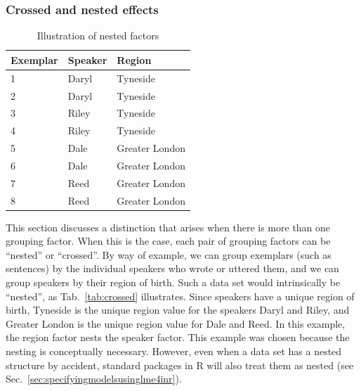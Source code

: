 \subsubsection{Crossed and nested effects}
\label{sec:crossedandnestedeffects}

\begin{table}
  \centering
  \caption{Illustration of nested factors}
  \begin{tabular}{lll}
    \toprule
    \textbf{Exemplar} & \textbf{Speaker}  & \textbf{Region}        \\
    \midrule
                    1 &           Daryl  &         Tyneside       \\
                    2 &           Daryl  &         Tyneside       \\
                    3 &           Riley  &         Tyneside       \\
                    4 &           Riley  &         Tyneside       \\
                    5 &           Dale   &         Greater London \\
                    6 &           Dale   &         Greater London \\
                    7 &           Reed   &         Greater London \\
                    8 &           Reed   &         Greater London \\
    \bottomrule
  \end{tabular}
  \label{tab:nested}
\end{table}

This section discusses a distinction that arises when there is more than one grouping factor.
When this is the case, each pair of grouping factors can be ``nested'' or ``crossed''.
By way of example, we can group exemplars (such as sentences) by the individual speakers who wrote or uttered them, and we can group speakers by their region of birth.
Such a data set would intrinsically be ``nested'', as Tab.~\ref{tab:crossed} illustrates.
Since speakers have a unique region of birth, Tyneside is the unique region value for the speakers Daryl and Riley, and Greater London is the unique region value for Dale and Reed.
In this example, the region factor nests the speaker factor.
This example was chosen because the nesting is conceptually necessary.
However, even when a data set has a nested structure by accident, standard packages in R will also treat them as nested (see Sec.~\ref{sec:specifyingmodelsusinglme4inr}).

